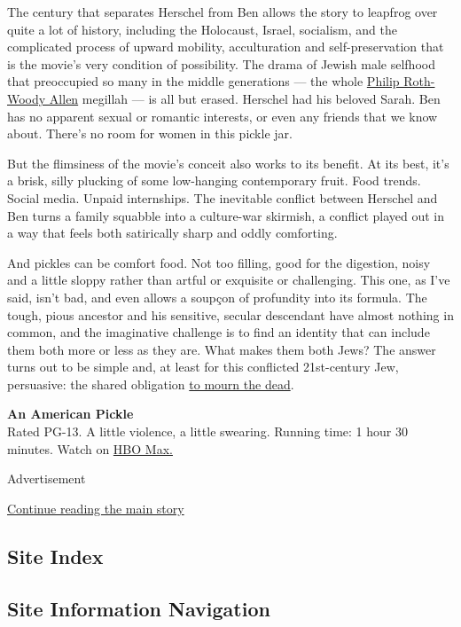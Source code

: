 The century that separates Herschel from Ben allows the story to
leapfrog over quite a lot of history, including the Holocaust, Israel,
socialism, and the complicated process of upward mobility, acculturation
and self-preservation that is the movie's very condition of possibility.
The drama of Jewish male selfhood that preoccupied so many in the middle
generations --- the whole
\href{https://slate.com/culture/2001/08/the-estranged-twins.html}{Philip
Roth-Woody Allen} megillah --- is all but erased. Herschel had his
beloved Sarah. Ben has no apparent sexual or romantic interests, or even
any friends that we know about. There's no room for women in this pickle
jar.

But the flimsiness of the movie's conceit also works to its benefit. At
its best, it's a brisk, silly plucking of some low-hanging contemporary
fruit. Food trends. Social media. Unpaid internships. The inevitable
conflict between Herschel and Ben turns a family squabble into a
culture-war skirmish, a conflict played out in a way that feels both
satirically sharp and oddly comforting.

And pickles can be comfort food. Not too filling, good for the
digestion, noisy and a little sloppy rather than artful or exquisite or
challenging. This one, as I've said, isn't bad, and even allows a
soupçon of profundity into its formula. The tough, pious ancestor and
his sensitive, secular descendant have almost nothing in common, and the
imaginative challenge is to find an identity that can include them both
more or less as they are. What makes them both Jews? The answer turns
out to be simple and, at least for this conflicted 21st-century Jew,
persuasive: the shared obligation
\href{https://www.myjewishlearning.com/article/text-of-the-mourners-kaddish/}{to
mourn the dead}.

\textbf{An American Pickle}\\
Rated PG-13. A little violence, a little swearing. Running time: 1 hour
30 minutes. Watch on \href{https://www.hbomax.com/}{HBO Max.}

Advertisement

\protect\hyperlink{after-bottom}{Continue reading the main story}

\hypertarget{site-index}{%
\subsection{Site Index}\label{site-index}}

\hypertarget{site-information-navigation}{%
\subsection{Site Information
Navigation}\label{site-information-navigation}}

